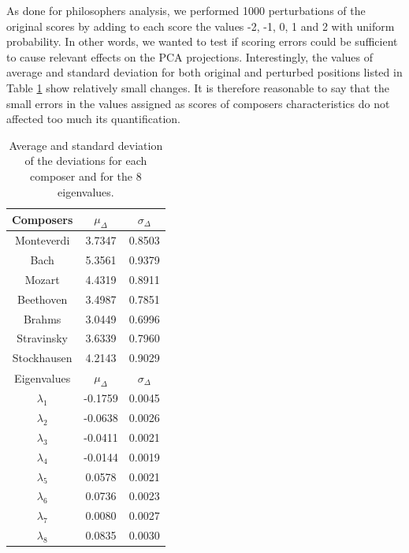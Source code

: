 \documentclass[
 aip,
 jmp,
 amsmath,amssymb,
 reprint,
]{revtex4-1}
\begin{document}
As done for philosophers analysis, we performed 1000 perturbations of
the original scores by adding to each score the values -2, -1, 0, 1 and 2 with
uniform probability. In other words, we wanted to test if scoring
errors could be sufficient to cause relevant effects
on the PCA projections. Interestingly, the values of average and
standard deviation for both original and perturbed positions listed in Table
\ref{tab:tableD} show relatively small changes. It is therefore
reasonable to say that the small errors in the values assigned as scores of composers
characteristics do not affected too much its quantification.

\begin{table}%
\caption{\label{tab:tableD}Average and standard deviation of the 
deviations for each composer and for the 
8 eigenvalues.}

\begin{tabular}{|c||c|c|}
\hline

Composers & $\mu_{\Delta}$ & $\sigma_{\Delta}$ \\
\hline

Monteverdi     & 3.7347 & 0.8503 \\
Bach           & 5.3561 & 0.9379 \\
Mozart         & 4.4319 & 0.8911 \\
Beethoven      & 3.4987 & 0.7851 \\
Brahms         & 3.0449 & 0.6996 \\
Stravinsky     & 3.6339 & 0.7960 \\
Stockhausen    & 4.2143 & 0.9029 \\
\hline \hline
Eigenvalues & $\mu_{\Delta}$ & $\sigma_{\Delta}$ \\
\hline
$\lambda_1$ &  -0.1759 & 0.0045 \\
$\lambda_2$ &  -0.0638 & 0.0026 \\
$\lambda_3$ &  -0.0411 & 0.0021 \\
$\lambda_4$ &  -0.0144 & 0.0019 \\
$\lambda_5$ &   0.0578 & 0.0021 \\
$\lambda_6$ &   0.0736 & 0.0023 \\
$\lambda_7$ &   0.0080 & 0.0027 \\
$\lambda_8$ &   0.0835 & 0.0030 \\
\hline

\end{tabular}
\end{table}
\end{document}
